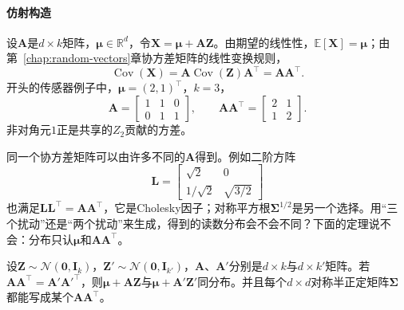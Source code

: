 \paragraph{仿射构造}
设$\bm{A}$是$d\times k$矩阵，$\bm{\mu}\in\mathbb{R}^{d}$，令$\bm{X}=\bm{\mu}+\bm{A}\bm{Z}$。由期望的线性性，$\mathbb{E}[\bm{X}]=\bm{\mu}$；由第~\ref{chap:random-vectors}章协方差矩阵的线性变换规则，
\[
 \operatorname{Cov}(\bm{X})=\bm{A}\operatorname{Cov}(\bm{Z})\bm{A}^{\top}=\bm{A}\bm{A}^{\top} .
\]
开头的传感器例子中，$\bm{\mu}=(2,1)^{\top}$，$k=3$，
\[
 \bm{A}=\begin{bmatrix}1&1&0\\0&1&1\end{bmatrix},\qquad
 \bm{A}\bm{A}^{\top}=\begin{bmatrix}2&1\\1&2\end{bmatrix} .
\]
非对角元$1$正是共享的$Z_2$贡献的方差。

同一个协方差矩阵可以由许多不同的$\bm{A}$得到。例如二阶方阵
\[
 \bm{L}=\begin{bmatrix}\sqrt2&0\\1/\sqrt2&\sqrt{3/2}\end{bmatrix}
\]
也满足$\bm{L}\bm{L}^{\top}=\bm{A}\bm{A}^{\top}$，它是Cholesky因子；对称平方根$\bm{\Sigma}^{1/2}$是另一个选择。用“三个扰动”还是“两个扰动”来生成，得到的读数分布会不会不同？下面的定理说不会：分布只认$\bm{\mu}$和$\bm{A}\bm{A}^{\top}$。

\begin{theorem}[多元高斯由均值与协方差确定]
\label{thm:mvd-gaussian-well-defined}
设$\bm{Z}\sim\mathcal{N}(\bm{0},\bm{I}_k)$，$\bm{Z}'\sim\mathcal{N}(\bm{0},\bm{I}_{k'})$，$\bm{A}$、$\bm{A}'$分别是$d\times k$与$d\times k'$矩阵。若$\bm{A}\bm{A}^{\top}=\bm{A}'\bm{A}'^{\top}$，则$\bm{\mu}+\bm{A}\bm{Z}$与$\bm{\mu}+\bm{A}'\bm{Z}'$同分布。并且每个$d\times d$对称半正定矩阵$\bm{\Sigma}$都能写成某个$\bm{A}\bm{A}^{\top}$。
\end{theorem}

